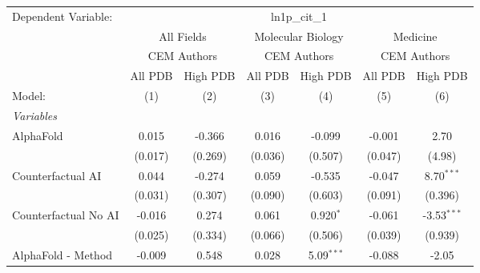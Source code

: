 \begingroup
\centering
\begin{tabular}{lcccccc}
   \tabularnewline \midrule \midrule
   Dependent Variable: & \multicolumn{6}{c}{ln1p\_cit\_1}\\
 & \multicolumn{2}{c}{All Fields} & \multicolumn{2}{c}{Molecular Biology} & \multicolumn{2}{c}{Medicine} \\
\cmidrule(lr){2-3} \cmidrule(lr){4-5} \cmidrule(lr){6-7}
 & \multicolumn{2}{c}{CEM Authors} & \multicolumn{2}{c}{CEM Authors} & \multicolumn{2}{c}{CEM Authors} \\
\cmidrule(lr){2-3} \cmidrule(lr){4-5} \cmidrule(lr){6-7}
 & \multicolumn{1}{c}{All PDB} & \multicolumn{1}{c}{High PDB} & \multicolumn{1}{c}{All PDB} & \multicolumn{1}{c}{High PDB} & \multicolumn{1}{c}{All PDB} & \multicolumn{1}{c}{High PDB} \\
\cmidrule(lr){2-2} \cmidrule(lr){3-3} \cmidrule(lr){4-4} \cmidrule(lr){5-5} \cmidrule(lr){6-6} \cmidrule(lr){7-7}
   Model:                                                     & (1)            & (2)           & (3)            & (4)           & (5)           & (6)\\  
   \midrule
   \emph{Variables}\\
   AlphaFold                                                  & 0.015          & -0.366        & 0.016          & -0.099        & -0.001        & 2.70\\   
                                                              & (0.017)        & (0.269)       & (0.036)        & (0.507)       & (0.047)       & (4.98)\\   
   Counterfactual AI                                          & 0.044          & -0.274        & 0.059          & -0.535        & -0.047        & 8.70$^{***}$\\   
                                                              & (0.031)        & (0.307)       & (0.090)        & (0.603)       & (0.091)       & (0.396)\\   
   Counterfactual No AI                                       & -0.016         & 0.274         & 0.061          & 0.920$^{*}$   & -0.061        & -3.53$^{***}$\\   
                                                              & (0.025)        & (0.334)       & (0.066)        & (0.506)       & (0.039)       & (0.939)\\   
   AlphaFold - Method                                         & -0.009         & 0.548         & 0.028          & 5.09$^{***}$  & -0.088        & -2.05\\   

\end{tabular}
